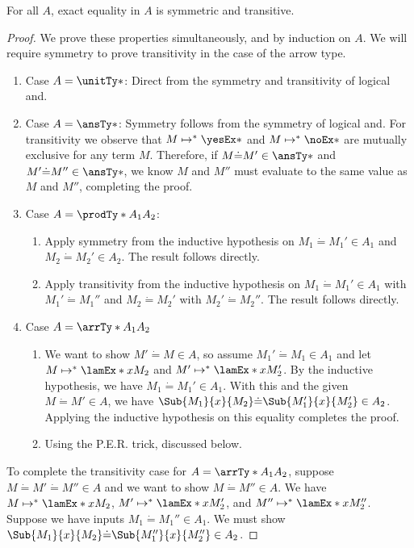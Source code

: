 \documentclass[letterpaper]{article}
\begin{document}
\begin{lemma}
    For all $A$, exact equality in $A$ is symmetric and transitive.
\end{lemma}
\begin{proof}
We prove these properties simultaneously, and by induction on $A$. We will require symmetry to prove transitivity in the case of the arrow type.

\begin{enumerate}
    \item Case $A = \unitTy*$: Direct from the symmetry and transitivity of logical and.
    \item Case $A = \ansTy*$: Symmetry follows from the symmetry of logical and. For transitivity we observe that $M \mapsto^* \yesEx*$ and $M \mapsto^* \noEx*$
    are mutually exclusive for any term $M$. Therefore, if $M \dot{=} M' \in \ansTy*$ and $M' \dot{=} M'' \in \ansTy*$, we know $M$ and $M''$ must evaluate to
    the same value as $M$ and $M''$, completing the proof.
    \item Case $A = \prodTy*{A_1}{A_2}$:
    \begin{enumerate}
        \item Apply symmetry from the inductive hypothesis on $M_1 \dot{=} M_1' \in A_1$ and $M_2 \dot{=} M_2' \in A_2$. The result follows directly.
        \item Apply transitivity from the inductive hypothesis on $M_1 \dot{=} M_1' \in A_1$ with $M_1' \dot{=} M_1''$ and $M_2 \dot{=} M_2'$ with $M_2' \dot{=} M_2''$.
        The result follows directly.
    \end{enumerate}
    \item Case $A = \arrTy*{A_1}{A_2}$
    \begin{enumerate}
        \item We want to show $M' \dot{=} M \in A$, so assume $M_1' \dot{=} M_1 \in A_1$ and let $M \mapsto^* \lamEx*{x}{M_2}$ and $M' \mapsto^* \lamEx*{x}{M_2'}$.
        By the inductive hypothesis, we have $M_1 \dot{=} M_1' \in A_1$. With this and the given $M \dot{=} M' \in A$,
        we have $\Sub{M_1}{x}{M_2} \dot{=} \Sub{M_1'}{x}{M_2'} \in A_2$. Applying the inductive hypothesis on this equality completes the proof.
        \item Using the P.E.R. trick, discussed below.
    \end{enumerate}
\end{enumerate}

To complete the transitivity case for $A = \arrTy*{A_1}{A_2}$, suppose $M \dot{=} M' \dot{=} M'' \in A$ and we want to show $M \dot{=} M'' \in A$.
We have $M \mapsto^* \lamEx*{x}{M_2}$, $M' \mapsto^* \lamEx*{x}{M_2'}$, and $M'' \mapsto^* \lamEx*{x}{M_2''}$. Suppose we have inputs $M_1 \dot{=} M_1'' \in A_1$.
We must show $\Sub{M_1}{x}{M_2} \dot{=} \Sub{M_1''}{x}{M_2''} \in A_2$.


\end{proof}
\end{document}
